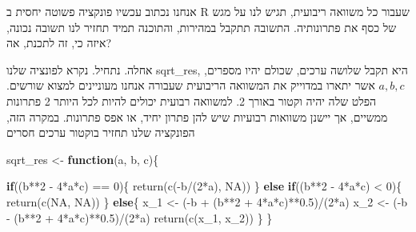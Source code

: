 \documentclass[
]{book}
\newenvironment{Shaded}{\begin{snugshade}}{\end{snugshade}}
\newcommand{\ConstantTok}[1]{\textcolor[rgb]{0.00,0.00,0.00}{#1}}
\newcommand{\ControlFlowTok}[1]{\textcolor[rgb]{0.13,0.29,0.53}{\textbf{#1}}}
\newcommand{\DecValTok}[1]{\textcolor[rgb]{0.00,0.00,0.81}{#1}}
\newcommand{\FloatTok}[1]{\textcolor[rgb]{0.00,0.00,0.81}{#1}}
\newcommand{\FunctionTok}[1]{\textcolor[rgb]{0.00,0.00,0.00}{#1}}
\newcommand{\NormalTok}[1]{#1}
\newcommand{\OtherTok}[1]{\textcolor[rgb]{0.56,0.35,0.01}{#1}}
\newcommand{\SpecialCharTok}[1]{\textcolor[rgb]{0.00,0.00,0.00}{#1}}
\begin{document}
אנחנו נכתוב עכשיו פונקציה פשוטה יחסית ב
R
שעבור כל משוואה ריבועית, תגיש לנו על מגש של כסף את פתרונותיה.
התשובה תתקבל במהירות, והתוכנה תמיד תחזיר לנו תשובה נכונה, איזה כי, זה לתכנת, אה?

אחלה. נתחיל. נקרא לפונציה שלנו
sqrt\_res,
היא תקבל שלושה ערכים, שכולם יהיו מספרים,
\(a, b, c\)
אשר יתארו במדוייק את המשוואה הריבועית שעבורה אנחנו מעוניינים למצוא שורשים.
הפלט שלה יהיה וקטור באורך 2.
למשוואה רבועית יכולים להיות לכל היותר 2 פתרונות ממשיים, אך יישנן משוואות רבועיות שיש להן פתרון יחיד, או אפס פתרונות.
במקרה הזה, הפונקציה שלנו תחזיר בוקטור ערכים חסרים

\begin{Shaded}
\begin{Highlighting}[]
\NormalTok{sqrt\_res }\OtherTok{\textless{}{-}} \ControlFlowTok{function}\NormalTok{(a, b, c)\{}
  
  \ControlFlowTok{if}\NormalTok{((b}\SpecialCharTok{**}\DecValTok{2} \SpecialCharTok{{-}} \DecValTok{4}\SpecialCharTok{*}\NormalTok{a}\SpecialCharTok{*}\NormalTok{c) }\SpecialCharTok{==} \DecValTok{0}\NormalTok{)\{}
    \FunctionTok{return}\NormalTok{(}\FunctionTok{c}\NormalTok{(}\SpecialCharTok{{-}}\NormalTok{b}\SpecialCharTok{/}\NormalTok{(}\DecValTok{2}\SpecialCharTok{*}\NormalTok{a), }\ConstantTok{NA}\NormalTok{))}
\NormalTok{  \} }\ControlFlowTok{else} \ControlFlowTok{if}\NormalTok{((b}\SpecialCharTok{**}\DecValTok{2} \SpecialCharTok{{-}} \DecValTok{4}\SpecialCharTok{*}\NormalTok{a}\SpecialCharTok{*}\NormalTok{c) }\SpecialCharTok{\textless{}} \DecValTok{0}\NormalTok{)\{}
    \FunctionTok{return}\NormalTok{(}\FunctionTok{c}\NormalTok{(}\ConstantTok{NA}\NormalTok{, }\ConstantTok{NA}\NormalTok{))}
\NormalTok{  \} }\ControlFlowTok{else}\NormalTok{\{}
\NormalTok{    x\_1 }\OtherTok{\textless{}{-}}\NormalTok{ (}\SpecialCharTok{{-}}\NormalTok{b }\SpecialCharTok{+}\NormalTok{ (b}\SpecialCharTok{**}\DecValTok{2} \SpecialCharTok{+} \DecValTok{4}\SpecialCharTok{*}\NormalTok{a}\SpecialCharTok{*}\NormalTok{c)}\SpecialCharTok{**}\FloatTok{0.5}\NormalTok{)}\SpecialCharTok{/}\NormalTok{(}\DecValTok{2}\SpecialCharTok{*}\NormalTok{a)}
\NormalTok{    x\_2 }\OtherTok{\textless{}{-}}\NormalTok{ (}\SpecialCharTok{{-}}\NormalTok{b }\SpecialCharTok{{-}}\NormalTok{ (b}\SpecialCharTok{**}\DecValTok{2} \SpecialCharTok{+} \DecValTok{4}\SpecialCharTok{*}\NormalTok{a}\SpecialCharTok{*}\NormalTok{c)}\SpecialCharTok{**}\FloatTok{0.5}\NormalTok{)}\SpecialCharTok{/}\NormalTok{(}\DecValTok{2}\SpecialCharTok{*}\NormalTok{a)}
    \FunctionTok{return}\NormalTok{(}\FunctionTok{c}\NormalTok{(x\_1, x\_2))}
\NormalTok{  \}}
\NormalTok{\}}
\end{Highlighting}
\end{Shaded}
\end{document}
